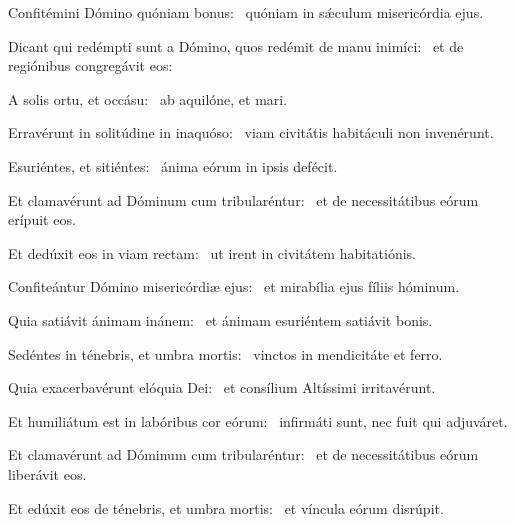 \item Confitémini Dómino quóniam bonus:~\psstar{} quóniam in sǽculum misericórdia ejus.

\item Dicant qui redémpti sunt a Dómino, quos redémit de manu inimíci:~\psstar{} et de regiónibus congregávit eos:

\item A solis ortu, et occásu:~\psstar{} ab aquilóne, et mari.

\item Erravérunt in solitúdine in inaquóso:~\psstar{} viam civitátis habitáculi non invenérunt.

\item Esuriéntes, et sitiéntes:~\psstar{} ánima eórum in ipsis defécit.

\item Et clamavérunt ad Dóminum cum tribularéntur:~\psstar{} et de necessitátibus eórum erípuit eos.

\item Et dedúxit eos in viam rectam:~\psstar{} ut irent in civitátem habitatiónis.

\item Confiteántur Dómino misericórdiæ ejus:~\psstar{} et mirabília ejus fíliis hóminum.

\item Quia satiávit ánimam inánem:~\psstar{} et ánimam esuriéntem satiávit bonis.

\item Sedéntes in ténebris, et umbra mortis:~\psstar{} vinctos in mendicitáte et ferro.

\item Quia exacerbavérunt elóquia Dei:~\psstar{} et consílium Altíssimi irritavérunt.

\item Et humiliátum est in labóribus cor eórum:~\psstar{} infirmáti sunt, nec fuit qui adjuváret.

\item Et clamavérunt ad Dóminum cum tribularéntur:~\psstar{} et de necessitátibus eórum liberávit eos.

\item Et edúxit eos de ténebris, et umbra mortis:~\psstar{} et víncula eórum disrúpit.
